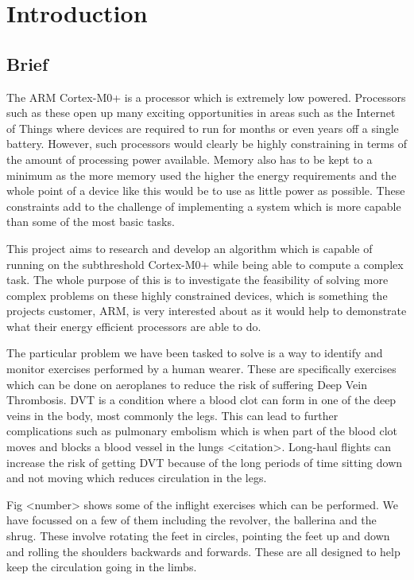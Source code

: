 \chapter{Introduction}

\section{Brief}
The ARM Cortex-M0+ is a processor which is extremely low powered. Processors such as these open up many exciting opportunities in areas such as the Internet of Things where devices are required to run for months or even years off a single battery. However, such processors would clearly be highly constraining in terms of the amount of processing power available. Memory also has to be kept to a minimum as the more memory used the higher the energy requirements and the whole point of a device like this would be to use as little power as possible. These constraints add to the challenge of implementing a system which is more capable than some of the most basic tasks.

This project aims to research and develop an algorithm which is capable of running on the subthreshold Cortex-M0+ while being able to compute a complex task. The whole purpose of this is to investigate the feasibility of solving more complex problems on these highly constrained devices, which is something the projects customer, ARM, is very interested about as it would help to demonstrate what their energy efficient processors are able to do.

The particular problem we have been tasked to solve is a way to identify and monitor exercises performed by a human wearer. These are specifically exercises which can be done on aeroplanes to reduce the risk of suffering Deep Vein Thrombosis. DVT is a condition where a blood clot can form in one of the deep veins in the body, most commonly the legs. This can lead to further complications such as pulmonary embolism which is when part of the blood clot moves and blocks a blood vessel in the lungs <citation>. Long-haul flights can increase the risk of getting DVT because of the long periods of time sitting down and not moving which reduces circulation in the legs.

Fig <number> shows some of the inflight exercises which can be performed. We have focussed on a few of them including the revolver, the ballerina and the shrug. These involve rotating the feet in circles, pointing the feet up and down and rolling the shoulders backwards and forwards. These are all designed to help keep the circulation going in the limbs.

